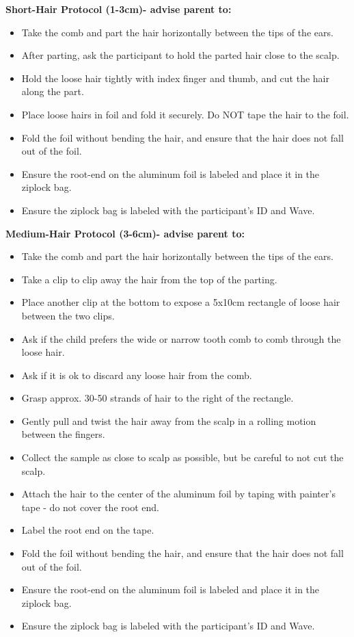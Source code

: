 \documentclass[]{book}
\providecommand{\tightlist}{%
  \setlength{\itemsep}{0pt}\setlength{\parskip}{0pt}}
\begin{document}
\textbf{Short-Hair Protocol (1-3cm)- advise parent to:}

\begin{itemize}
\tightlist
\item
  Take the comb and part the hair horizontally between the tips of the ears.
\item
  After parting, ask the participant to hold the parted hair close to the scalp.
\item
  Hold the loose hair tightly with index finger and thumb, and cut the hair along the part.
\item
  Place loose hairs in foil and fold it securely. Do NOT tape the hair to the foil.
\item
  Fold the foil without bending the hair, and ensure that the hair does not fall out of the foil.
\item
  Ensure the root-end on the aluminum foil is labeled and place it in the ziplock bag.
\item
  Ensure the ziplock bag is labeled with the participant's ID and Wave.
\end{itemize}

\textbf{Medium-Hair Protocol (3-6cm)- advise parent to:}

\begin{itemize}
\tightlist
\item
  Take the comb and part the hair horizontally between the tips of the ears.
\item
  Take a clip to clip away the hair from the top of the parting.
\item
  Place another clip at the bottom to expose a 5x10cm rectangle of loose hair between the two clips.
\item
  Ask if the child prefers the wide or narrow tooth comb to comb through the loose hair.
\item
  Ask if it is ok to discard any loose hair from the comb.
\item
  Grasp approx. 30-50 strands of hair to the right of the rectangle.
\item
  Gently pull and twist the hair away from the scalp in a rolling motion between the fingers.
\item
  Collect the sample as close to scalp as possible, but be careful to not cut the scalp.
\item
  Attach the hair to the center of the aluminum foil by taping with painter's tape - do not cover the root end.
\item
  Label the root end on the tape.
\item
  Fold the foil without bending the hair, and ensure that the hair does not fall out of the foil.
\item
  Ensure the root-end on the aluminum foil is labeled and place it in the ziplock bag.
\item
  Ensure the ziplock bag is labeled with the participant's ID and Wave.
\end{itemize}
\end{document}
